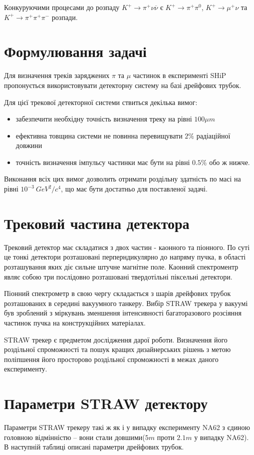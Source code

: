 \documentclass[]{article}
\begin{document}
		Конкуруючими процесами до розпаду 
		$ K^+ \rightarrow \pi^+\nu \overline{\nu} $ є 
		$ K^+ \rightarrow \pi^+\pi^0 $, 
		$ K^+ \rightarrow \mu^+ \nu $ та 
		$ K^+ \rightarrow \pi^+ \pi^+ \pi^- $ розпади.
		
		\section{Формулювання задачі}
		Для визначення треків заряджених $\pi$ та $\mu$ частинок в експерименті SHiP пропонується використовувати детекторну систему на базі дрейфових трубок.
		
		Для цієї трекової детекторної системи ствиться декілька вимог:
		\begin{itemize}
		\item забезпечити необхідну точність визначення треку на рівні $100 \mu m$
		\item ефективна товщина системи не повинна перевищувати $2\%$ радіаційної довжини
		\item точність визначення імпульсу частинки має бути на рівні $0.5\%$ обо ж нижче.
\end{itemize}
		Виконання всіх цих вимог дозволить отримати роздільну здатність по масі на рівні $10^{-3}~GeV^2 / c^4$, що має бути достатньо для поставленої задачі.
		\section{Трековий частина детектора}
		Трековий детектор має складатися з двох частин - каонного та піонного. По суті це тонкі детектори розташовані перперндикулярно до напряму пучка, в області розташування яких діє сильне штучне магнітне поле. Каонний спектроментр являє собою три послідовно розташовані твердотільні піксельні детектори.
		
		Піонний спектрометр в свою чергу складається з шарів дрейфових трубок розташованих в середині вакуумного танкеру. Вибір STRAW трекера у вакуумі був зроблений з міркувань зменшення інтенсивності багаторазового розсіяння частинок пучка на конструкційних матеріалах.
		
		STRAW трекер є предметом дослідження дарої роботи. Визначення його роздільної спроможності та пошук кращих дизайнерських рішень з метою поліпшення його просторово роздільної спроможності в межах даного експерименту.
		 
		\section{Параметри STRAW детектору}
		Параметри STRAW трекеру такі ж як і у випадку експерименту NA62 з єдиною головною відмінністю -- вони стали довшими($5m$ проти $2.1m$ у випадку NA62). В наступній таблиці описані параметри дрейфових трубок.
		
\end{document}
